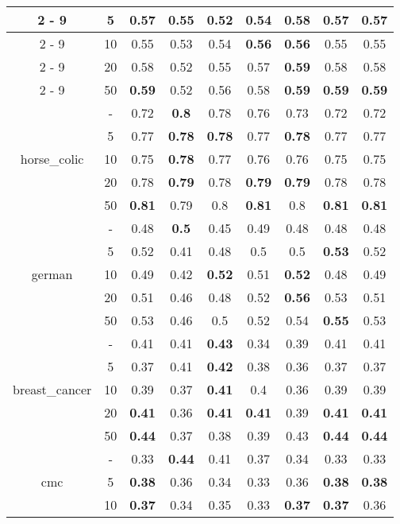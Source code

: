 \documentclass{article}%
\begin{document}
\begin{tabular}{c|c|ccccccc}
\cline{2%
-%
9}%
&5&0.57&0.55&0.52&0.54&\textbf{0.58}&0.57&0.57\\%
\cline{2%
-%
9}%
&10&0.55&0.53&0.54&\textbf{0.56}&\textbf{0.56}&0.55&0.55\\%
\cline{2%
-%
9}%
&20&0.58&0.52&0.55&0.57&\textbf{0.59}&0.58&0.58\\%
\cline{2%
-%
9}%
&50&\textbf{0.59}&0.52&0.56&0.58&\textbf{0.59}&\textbf{0.59}&\textbf{0.59}\\%
\hline%
\multirow{5}{*}{horse\_colic}&{-}&0.72&\textbf{0.8}&0.78&0.76&0.73&0.72&0.72\\%
\cline{2%
-%
9}%
&5&0.77&\textbf{0.78}&\textbf{0.78}&0.77&\textbf{0.78}&0.77&0.77\\%
\cline{2%
-%
9}%
&10&0.75&\textbf{0.78}&0.77&0.76&0.76&0.75&0.75\\%
\cline{2%
-%
9}%
&20&0.78&\textbf{0.79}&0.78&\textbf{0.79}&\textbf{0.79}&0.78&0.78\\%
\cline{2%
-%
9}%
&50&\textbf{0.81}&0.79&0.8&\textbf{0.81}&0.8&\textbf{0.81}&\textbf{0.81}\\%
\hline%
\multirow{5}{*}{german}&{-}&0.48&\textbf{0.5}&0.45&0.49&0.48&0.48&0.48\\%
\cline{2%
-%
9}%
&5&0.52&0.41&0.48&0.5&0.5&\textbf{0.53}&0.52\\%
\cline{2%
-%
9}%
&10&0.49&0.42&\textbf{0.52}&0.51&\textbf{0.52}&0.48&0.49\\%
\cline{2%
-%
9}%
&20&0.51&0.46&0.48&0.52&\textbf{0.56}&0.53&0.51\\%
\cline{2%
-%
9}%
&50&0.53&0.46&0.5&0.52&0.54&\textbf{0.55}&0.53\\%
\hline%
\multirow{5}{*}{breast\_cancer}&{-}&0.41&0.41&\textbf{0.43}&0.34&0.39&0.41&0.41\\%
\cline{2%
-%
9}%
&5&0.37&0.41&\textbf{0.42}&0.38&0.36&0.37&0.37\\%
\cline{2%
-%
9}%
&10&0.39&0.37&\textbf{0.41}&0.4&0.36&0.39&0.39\\%
\cline{2%
-%
9}%
&20&\textbf{0.41}&0.36&\textbf{0.41}&\textbf{0.41}&0.39&\textbf{0.41}&\textbf{0.41}\\%
\cline{2%
-%
9}%
&50&\textbf{0.44}&0.37&0.38&0.39&0.43&\textbf{0.44}&\textbf{0.44}\\%
\hline%
\multirow{5}{*}{cmc}&{-}&0.33&\textbf{0.44}&0.41&0.37&0.34&0.33&0.33\\%
\cline{2%
-%
9}%
&5&\textbf{0.38}&0.36&0.34&0.33&0.36&\textbf{0.38}&\textbf{0.38}\\%
\cline{2%
-%
9}%
&10&\textbf{0.37}&0.34&0.35&0.33&\textbf{0.37}&\textbf{0.37}&0.36\\%

\end{tabular}
\end{document}
